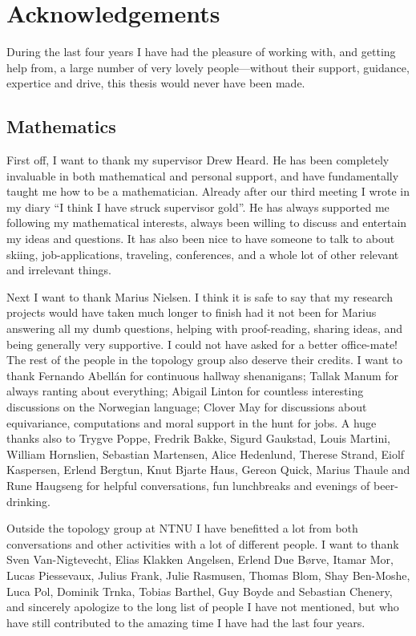 
\section*{Acknowledgements}

During the last four years I have had the pleasure of working with, and getting help from, a large number of very lovely people---without their support, guidance, expertice and drive, this thesis would never have been made. 

\subsection*{Mathematics}

First off, I want to thank my supervisor Drew Heard. He has been completely invaluable in both mathematical and personal support, and have fundamentally taught me how to be a mathematician. Already after our third meeting I wrote in my diary ``I think I have struck supervisor gold''. He has always supported me following my mathematical interests, always been willing to discuss and entertain my ideas and questions. It has also been nice to have someone to talk to about skiing, job-applications, traveling, conferences, and a whole lot of other relevant and irrelevant things. 

Next I want to thank Marius Nielsen. I think it is safe to say that my research projects would have taken much longer to finish had it not been for Marius answering all my dumb questions, helping with proof-reading, sharing ideas, and being generally very supportive. I could not have asked for a better office-mate! The rest of the people in the topology group also deserve their credits. I want to thank Fernando Abellán for continuous hallway shenanigans; Tallak Manum for always ranting about everything; Abigail Linton for countless interesting discussions on the Norwegian language; Clover May for discussions about equivariance, computations and moral support in the hunt for jobs. A huge thanks also to Trygve Poppe, Fredrik Bakke, Sigurd Gaukstad, Louis Martini, William Hornslien, Sebastian Martensen, Alice Hedenlund, Therese Strand, Eiolf Kaspersen, Erlend Bergtun, Knut Bjarte Haus, Gereon Quick, Marius Thaule and Rune Haugseng for helpful conversations, fun lunchbreaks and evenings of beer-drinking.

Outside the topology group at NTNU I have benefitted a lot from both conversations and other activities with a lot of different people. I want to thank Sven Van-Nigtevecht, Elias Klakken Angelsen, Erlend Due Børve, Itamar Mor, Lucas Piessevaux, Julius Frank, Julie Rasmusen, Thomas Blom, Shay Ben-Moshe, Luca Pol, Dominik Trnka, Tobias Barthel, Guy Boyde and Sebastian Chenery, and sincerely apologize to the long list of people I have not mentioned, but who have still contributed to the amazing time I have had the last four years. 

